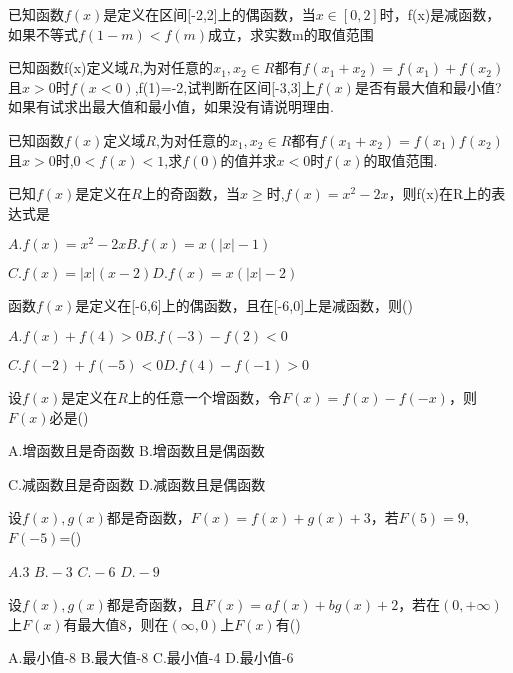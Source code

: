 \vspace{2.5cm}
\begin{example}
已知函数$f(x)$是定义在区间[-2,2]上的偶函数，当$x\in [0,2]$时，f(x)是减函数，如果不等式$f(1-m)<f(m)$成立，求实数m的取值范围
\end{example}
\vspace{2.5cm}
\begin{example}
	已知函数f(x)定义域$R$,为对任意的$x_1,x_2\in R$都有$f(x_1+x_2)=f(x_1)+f(x_2)$且$x>0$时$f(x<0)$,f(1)=-2,试判断在区间[-3,3]上$f(x)$是否有最大值和最小值?如果有试求出最大值和最小值，如果没有请说明理由. 
\end{example}
\vspace{2.5cm}
\begin{example}
已知函数$f(x)$定义域$R$,为对任意的$x_1,x_2\in R$都有$f(x_1+x_2)=f(x_1)f(x_2)$且$x>0$时,$0<f(x)<1$,求$f(0)$的值并求$x<0$时$f(x)$的取值范围.
\end{example}
\vspace{2.5cm}
\begin{example}
已知$f(x)$是定义在$R$上的奇函数，当$x\geq$时,$f(x)=x^2-2x$，则f(x)在R上的表达式是\par
$A.f(x)=x^2-2x$\hfil $B.f(x)=x(|x|-1)$\par
$C.f(x)=|x|(x-2)$\hfil $D.f(x)=x(|x|-2)$
\end{example}
\begin{example}
函数$f(x)$是定义在[-6,6]上的偶函数，且在[-6,0]上是减函数，则(\qquad)\par
$A.f(x)+f(4)>0$\hfil $B.f(-3)-f(2)<0$\par
$C.f(-2)+f(-5)<0$\hfil $D.f(4)-f(-1)>0$
\end{example}
\begin{example}
设$f(x)$是定义在$R$上的任意一个增函数，令$F(x)=f(x)-f(-x)$，则$F(x)$必是(\qquad)\par
A.增函数且是奇函数      \hfil    B.增函数且是偶函数 \par
 C.减函数且是奇函数       \hfil   D.减函数且是偶函数
\end{example}
\begin{example}
	设$f(x),g(x)$都是奇函数，$F(x)=f(x)+g(x)+3$，若$F(5)=9$,$F(-5)$=(\qquad)\par
	$A.3$  \hfil $B.-3$  \hfil $C.-6$  \hfil $D.-9$ 
\end{example}
\begin{example}
设$f(x),g(x)$都是奇函数，且$F(x)=af(x)+bg(x)+2$，若在$(0,+\infty)$上$F(x)$有最大值8，则在$(\infty,0)$上$F(x)$有(\qquad)\par
A.最小值-8  \hfil       B.最大值-8  \hfil     C.最小值-4  \hfil         D.最小值-6
\end{example}
